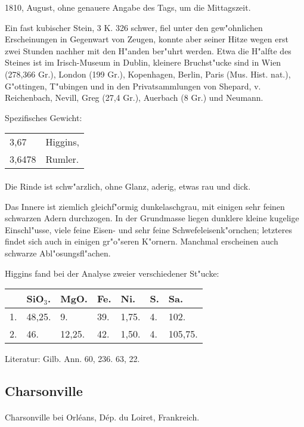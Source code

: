\documentclass[a4paper, 11pt, oneside]{article}
\begin{document}
1810, August, ohne genauere Angabe des Tags, um die Mittagszeit.

Ein fast kubischer Stein, 3 K. 326 schwer, fiel unter den gew"ohnlichen Erscheinungen in Gegenwart von Zeugen, konnte aber seiner Hitze wegen erst zwei Stunden nachher mit den H"anden ber"uhrt werden. Etwa die H"alfte des Steines ist im Irisch-Museum in Dublin, kleinere Bruchst"ucke sind in Wien (278,366 Gr.), London (199 Gr.), Kopenhagen, Berlin, Paris (Mus. Hist. nat.), G"ottingen, T"ubingen und in den Privatsammlungen von Shepard, v. Reichenbach, Nevill, Greg (27,4 Gr.), Auerbach (8 Gr.) und Neumann.

Spezifisches Gewicht:
\begin{table}[!ht]
    \centering
    \begin{tabular}{l l}
        3,67 & Higgins,\\
        3,6478 & Rumler.
    \end{tabular}
\end{table}
\paragraph{}
Die Rinde ist schw"arzlich, ohne Glanz, aderig, etwas rau und dick.

Das Innere ist ziemlich gleichf"ormig dunkelaschgrau, mit einigen sehr feinen schwarzen Adern durchzogen. In der Grundmasse liegen dunklere kleine kugelige Einschl"usse, viele feine Eisen- und sehr feine Schwefeleisenk"ornchen; letzteres findet sich auch in einigen gr"o"seren K"ornern. Manchmal erscheinen auch schwarze Abl"osungsfl"achen.

Higgins fand bei der Analyse zweier verschiedener St"ucke:
\begin{table}[!ht]
    \centering
    \begin{tabular}{l l l l l l l}
         & SiO$_{3}$. & MgO. & Fe. & Ni. & S. & Sa. \\ \hline
        1. & 48,25. & 9. & 39. & 1,75. & 4. & 102. \\
        2. & 46. & 12,25. & 42. & 1,50. & 4. & 105,75. \\
    \end{tabular}
\end{table}

\footnotesize
Literatur: Gilb. Ann. 60, 236. 63, 22.
\subsection{Charsonville}
\normalsize
\paragraph{}
Charsonville bei Orléans, Dép. du Loiret, Frankreich.
\end{document}
